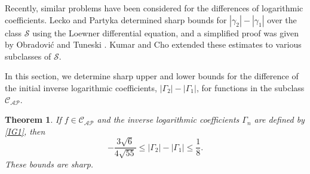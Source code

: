 \documentclass[11pt]{article}
\newtheorem{theo}{Theorem}[section]
\numberwithin{equation}{section}
\begin{document}
Recently, similar problems have been considered for the differences of logarithmic coefficients. Lecko and Partyka \cite{Lecko2023} determined sharp bounds for $|\gamma_2| - |\gamma_1|$ over the class $\mathcal{S}$ using the Loewner differential equation, and a simplified proof was given by Obradovi\'{c} and Tuneski \cite{Obradovic2024}. Kumar and Cho \cite{Kumar2023} extended these estimates to various subclasses of $\mathcal{S}$.

In this section, we determine sharp upper and lower bounds for the difference of the initial inverse logarithmic coefficients, $|\Gamma_2| - |\Gamma_1|$, for functions in the subclass $\mathcal{C}_{\mathcal{AP}}$.

\begin{theo}\label{T2}
If $f \in \mathcal{C}_{\mathcal{AP}}$ and the inverse logarithmic coefficients $\Gamma_n$ are defined by \eqref{IG1}, then
\begin{equation}\label{po9}
-\frac{3\sqrt{6}}{4\sqrt{55}} \le |\Gamma_2|-|\Gamma_1| \le \frac{1}{8}.
\end{equation}
These bounds are sharp.
\end{theo}
\end{document}
